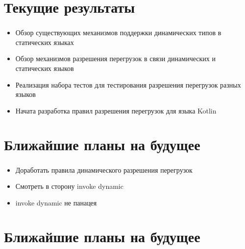 \documentclass[t]{beamer}  %
\newcommand{\questionframe}[2]{
    \frame[c,plain]{
        \centering\huge
        \textbf{\structure{#1}}
        \par\bigskip
        #2
    }
}
\begin{document}
\section{Текущие результаты}
\begin{frame}
	\frametitle{\insertsection} 
    \begin{block}{}
		\begin{itemize}
		\item Обзор существующих механизмов поддержки динамических типов в статических языках
        \item Обзор механизмов разрешения перегрузок в связи динамических и статических языков
        \item Реализация набора тестов для тестирования разрешения перегрузок разных языков
        \item Начата разработка правил разрешения перегрузок для языка Kotlin
		\end{itemize}
	\end{block}
\end{frame}

\section{Ближайшие планы на будущее}
\begin{frame}
	\frametitle{\insertsection} 
    \begin{block}{}
		\begin{itemize}
        \item Доработать правила динамического разрешения перегрузок
		\item Смотреть в сторону invoke dynamic
        \item invoke dynamic не панацея
		\end{itemize}
	\end{block}
\end{frame}


\section{Ближайшие планы на будущее}

\questionframe{Вопросы? }{}
\end{document}
